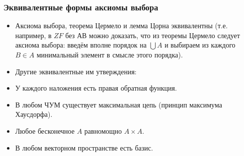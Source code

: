 \documentclass[10pt]{beamer}
\begin{document}
\begin{frame}
    \frametitle{Эквивалентные формы аксиомы выбора}
    \begin{itemize}
        \item Аксиома выбора, теорема Цермело и лемма Цорна эквивалентны (т.е. например, в $ZF$ без АВ можно доказать, что из теоремы Цермело следует аксиома выбора: \pause введём вполне порядок на $\bigcup A$ и выбираем из каждого $B \in A$ минимальный элемент в смысле этого порядка).
        \item Другие эквивалентные им утверждения:
        \item У каждого наложения есть правая обратная функция.
        \item В любом ЧУМ существует максимальная цепь (принцип максимума Хаусдорфа).
        \item Любое бесконечное $A$ равномощно $A \times A$.
        \item В любом векторном пространстве есть базис.
    \end{itemize}
\end{frame}


\end{document}
